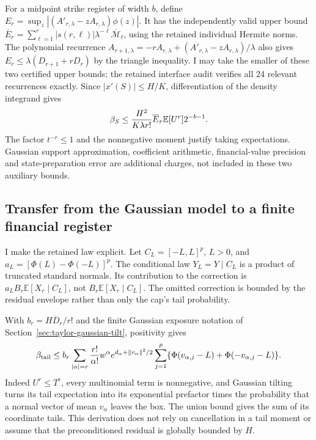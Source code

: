 For a midpoint strike register of width $b$, define
$E_r=\sup_z|(A'_{r,\lambda}-zA_{r,\lambda})\phi(z)|$.
It has the independently valid upper bound
$\overline E_r=\sum_{\ell=1}^r|s(r,\ell)|\lambda^{-\ell}\overline{\mathcal M}_\ell$,
using the retained individual Hermite norms. The polynomial recurrence
$A_{r+1,\lambda}=-rA_{r,\lambda}+(A'_{r,\lambda}-zA_{r,\lambda})/\lambda$
also gives $E_r\leq\lambda(D_{r+1}+rD_r)$ by the triangle inequality.
I may take the smaller of these two certified upper bounds; the retained
interface audit verifies all 24 relevant recurrences exactly. Since
$|x'(S)|\leq H/K$, differentiation of the density integrand gives
\begin{equation}
 \beta_S\leq {H^2\over K\lambda r!}\overline E_r
                   \mathbb E[U^r]2^{-b-1}.
 \label{eq:quantum-strike-grid-bias}
\end{equation}
The factor $t^{-r}\leq1$ and the nonnegative moment justify taking
expectations. Gaussian support approximation, coefficient arithmetic,
financial-value precision and state-preparation error are additional
charges, not included in these two auxiliary bounds.

\subsection{Transfer from the Gaussian model to a finite financial register}

I make the retained law explicit. Let $C_L=[-L,L]^p$, $L>0$, and
$a_L=[\Phi(L)-\Phi(-L)]^p$. The conditional law $Y_L=Y\mid C_L$ is a
product of truncated standard normals. Its contribution to the correction
is $a_L B_r\mathbb E[X_r\mid C_L]$, not $B_r\mathbb E[X_r\mid C_L]$.
The omitted correction is bounded by the residual envelope rather than
only the cap's tail probability.

With $b_r=H\overline D_r/r!$ and the finite Gaussian exposure notation of
Section~\ref{sec:taylor-gaussian-tilt}, positivity gives
\begin{equation}
 \beta_{\rm tail}\leq b_r\sum_{|\alpha|=r}{r!\over\alpha!}w^\alpha
 e^{d_\alpha+\|v_\alpha\|^2/2}
 \sum_{j=1}^p\{\Phi(v_{\alpha,j}-L)+\Phi(-v_{\alpha,j}-L)\}.
 \label{eq:quantum-remainder-tail}
\end{equation}
Indeed $U^r\leq T^r$, every multinomial term is nonnegative, and Gaussian
tilting turns its tail expectation into its exponential prefactor times
the probability that a normal vector of mean $v_\alpha$ leaves the box.
The union bound gives the sum of its coordinate tails. This derivation
does not rely on cancellation in a tail moment or assume that the
preconditioned residual is globally bounded by $H$.

